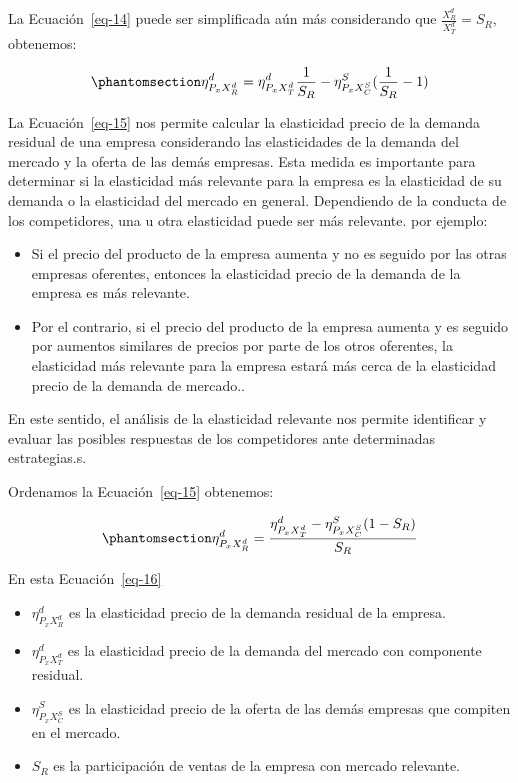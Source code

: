 \documentclass[
  doc,
  floatsintext,
  longtable,
  a4paper,
  nolmodern,
  notxfonts,
  notimes,
  12pt,
  colorlinks=true,linkcolor=blue,citecolor=blue,urlcolor=blue]{apa7}
\providecommand{\tightlist}{%
  \setlength{\itemsep}{0pt}\setlength{\parskip}{0pt}}
\begin{document}
La Ecuación~\ref{eq-14} puede ser simplificada aún más considerando que
\(\frac{X_R^d}{X_T^d} = S_R\), obtenemos:

\begin{equation}\protect\phantomsection\label{eq-15}{
\eta_{P_{x}X_R^d}^d = \eta_{P_{x}X_T^d}^d \frac{1}{S_R} - \eta_{P_{x}X_C^S}^S (\frac{1}{S_R} - 1)
}\end{equation}

La Ecuación~\ref{eq-15} nos permite calcular la elasticidad precio de la
demanda residual de una empresa considerando las elasticidades de la
demanda del mercado y la oferta de las demás empresas. Esta medida es
importante para determinar si la elasticidad más relevante para la
empresa es la elasticidad de su demanda o la elasticidad del mercado en
general. Dependiendo de la conducta de los competidores, una u otra
elasticidad puede ser más relevante. por ejemplo:

\begin{itemize}
\tightlist
\item
  Si el precio del producto de la empresa aumenta y no es seguido por
  las otras empresas oferentes, entonces la elasticidad precio de la
  demanda de la empresa es más relevante.
\item
  Por el contrario, si el precio del producto de la empresa aumenta y es
  seguido por aumentos similares de precios por parte de los otros
  oferentes, la elasticidad más relevante para la empresa estará más
  cerca de la elasticidad precio de la demanda de mercado..
\end{itemize}

En este sentido, el análisis de la elasticidad relevante nos permite
identificar y evaluar las posibles respuestas de los competidores ante
determinadas estrategias.s.

Ordenamos la Ecuación~\ref{eq-15} obtenemos:

\begin{equation}\protect\phantomsection\label{eq-16}{
\eta_{P_{x}X_R^d}^d = \frac{\eta_{P_{x}X_T^d}^d - \eta_{P_{x}X_C^S}^{S} (1-S_R)}{S_R}
}\end{equation}

En esta Ecuación~\ref{eq-16}

\begin{itemize}
\item
  \(\eta_{P_{x}X_R^d}^d\) es la elasticidad precio de la demanda
  residual de la empresa.
\item
  \(\eta_{P_{x}X_T^d}^d\) es la elasticidad precio de la demanda del
  mercado con componente residual.
\item
  \(\eta_{P_{x}X_C^S}^S\) es la elasticidad precio de la oferta de las
  demás empresas que compiten en el mercado.
\item
  \(S_R\) es la participación de ventas de la empresa con mercado
  relevante.
\end{itemize}
\end{document}
